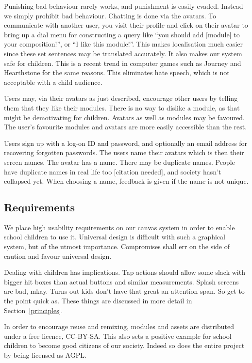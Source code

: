 Punishing bad behaviour rarely works, and punishment is easily evaded. Instead 
we simply prohibit bad behaviour. Chatting is done via the avatars. To 
communicate with another user, you visit their profile and click on their 
avatar to bring up a dial menu for constructing a query like ``you should add 
[module] to your composition!'', or ``I like this module!''. This makes 
localisation much easier since these set sentences may be translated 
accurately. It also makes our system safe for 
children\cite{sadler2012virtual}. This is a recent trend in computer games 
such as Journey and Hearthstone for the same reasons. This eliminates hate 
speech\cite{hearthstone}, which is not acceptable with a child audience.

Users may, via their avatars as just described, encourage other users by 
telling them that they like their modules. There is no way to dislike a 
module, as that might be demotivating for children. Avatars as well as modules 
may be favoured. The user's favourite modules and avatars are more easily 
accessible than the rest.

Users sign up with a log-on ID and password, and optionally an email address 
for recovering forgotten passwords. The users name their avatars which is then 
their screen names. The avatar has a name. There may be duplicate names. 
People have duplicate names in real life too [citation needed], and society 
hasn't collapsed yet. When choosing a name, feedback is given if the name is 
not unique.

\subsection{Requirements}
We place high usability requirements on our canvas system in order to enable
school children to use it. Universal design is difficult with such a graphical 
system, but of the utmost importance. Compromises shall err on the side of 
caution and favour universal design.

Dealing with children has implications. Tap actions should allow some slack 
with bigger hit boxes than actual buttons and similar measurements. Splash 
screens are bad, mkay. Turns out kids don't have that great an attention-span. 
So get to the point quick as. These things are discussed in more detail in 
Section~\ref{principles}.

In order to encourage reuse and remixing, modules and assets are distributed 
under a free licence, CC-BY-SA\@. This also sets a positive example for school 
children to become good citizens of our society. Indeed so does the entire 
project by being licensed as AGPL\@\cite{educational}.

